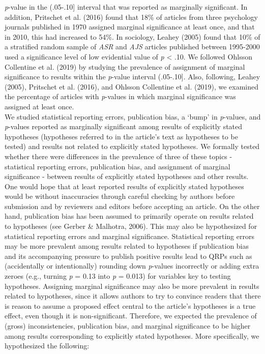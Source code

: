 \documentclass[
  12pt,
]{article}
\begin{document}
\emph{p}-value in the (.05-.10{]} interval that was reported as
marginally significant. In addition, Pritschet et al. (2016) found that
18\% of articles from three psychology journals published in 1970
assigned marginal significance at least once, and that in 2010, this had
increased to 54\%. In sociology, Leahey (2005) found that 10\% of a
stratified random sample of \emph{ASR} and \emph{AJS} articles published
between 1995-2000 used a significance level of low evidential value of
\emph{p} \textless{} .10. We followed Ohlsson Collentine et al. (2019)
by studying the prevalence of assignment of marginal significance to
results within the \emph{p}-value interval (.05-.10{]}. Also, following,
Leahey (2005), Pritschet et al. (2016), and Ohlsson Collentine et al.
(2019), we examined the percentage of articles with \emph{p}-values in
which marginal significance was assigned at least once.\\
\hspace*{0.333em}\hspace*{0.333em}\hspace*{0.333em}\hspace*{0.333em}We
studied statistical reporting errors, publication bias, a `bump' in
\emph{p}-values, and \emph{p}-values reported as marginally significant
among results of explicitly stated hypotheses (hypotheses referred to in
the article's text as hypotheses to be tested) and results not related
to explicitly stated hypotheses. We formally tested whether there were
differences in the prevalence of three of these topics - statistical
reporting errors, publication bias, and assignment of marginal
significance - between results of explicitly stated hypotheses and other
results. One would hope that at least reported results of explicitly
stated hypotheses would be without inaccuracies through careful checking
by authors before submission and by reviewers and editors before
accepting an article. On the other hand, publication bias has been
assumed to primarily operate on results related to hypotheses (see
Gerber \& Malhotra, 2006). This may also be hypothesized for statistical
reporting errors and marginal significance. Statistical reporting errors
may be more prevalent among results related to hypotheses if publication
bias and its accompanying pressure to publish positive results lead to
QRPs such as (accidentally or intentionally) rounding down
\emph{p}-values incorrectly or adding extra zeroes (e.g., turning
\emph{p} = 0.13 into \emph{p} = 0.013) for variables key to testing
hypotheses. Assigning marginal significance may also be more prevalent
in results related to hypotheses, since it allows authors to try to
convince readers that there is reason to assume a proposed effect
central to the article's hypotheses is a true effect, even though it is
non-significant. Therefore, we expected the prevalence of (gross)
inconsistencies, publication bias, and marginal significance to be
higher among results corresponding to explicitly stated hypotheses. More
specifically, we hypothesized the following:\\
\end{document}
